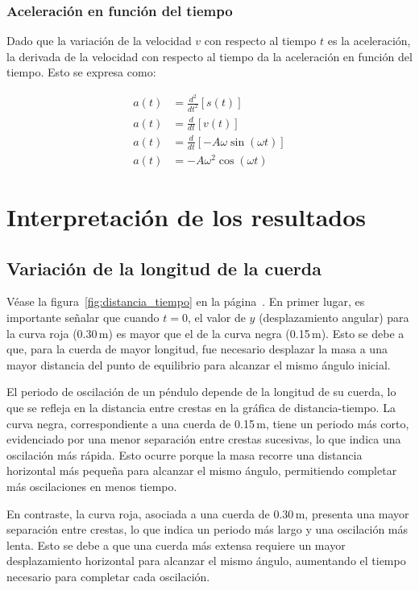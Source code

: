 \documentclass[letterpaper]{report}
\numberwithin{table}{section}
\begin{document}
\subsubsection{Aceleración en función del tiempo}

Dado que la variación de la velocidad $v$ con respecto al tiempo $t$
es la aceleración, la derivada de la velocidad con respecto al tiempo
da la aceleración en función del tiempo. Esto se expresa como:

\begin{align}
  a(t) &= \frac{d^{2}}{dt^{2}} \left[s(t)\right] \nonumber \\
  a(t) &= \frac{d}{dt} \left[v(t)\right] \nonumber \\
  a(t) &= \frac{d}{dt} \left[-A\omega\sin{(\omega t)}\right] \nonumber \\
  a(t) &= -A\omega^{2}\cos{(\omega t)}\label{eq:aceleración_tiempo}
\end{align}

\section{Interpretación de los resultados}

\subsection{Variación de la longitud de la cuerda}

Véase la figura~\ref{fig:distancia_tiempo} en la
página~\pageref{fig:distancia_tiempo}. En primer lugar, es
importante señalar que cuando $t=0$, el valor de $y$
(desplazamiento angular) para la curva roja (0.30\,m) es mayor que el de
la curva negra (0.15\,m). Esto se debe a que, para la cuerda de mayor
longitud, fue necesario desplazar la masa a una mayor distancia del
punto de equilibrio para alcanzar el mismo ángulo inicial.

El periodo de oscilación de un péndulo depende de la longitud de su
cuerda, lo que se refleja en la distancia entre crestas en la gráfica
de distancia-tiempo. La curva negra, correspondiente a una cuerda de
0.15\,m, tiene un periodo más corto, evidenciado por una menor
separación entre crestas sucesivas, lo que indica una oscilación más
rápida. Esto ocurre porque la masa recorre una distancia horizontal
más pequeña para alcanzar el mismo ángulo, permitiendo completar más
oscilaciones en menos tiempo.

En contraste, la curva roja, asociada a una cuerda de 0.30\,m, presenta
una mayor separación entre crestas, lo que indica un periodo más
largo y una oscilación más lenta. Esto se debe a que una cuerda más
extensa requiere un mayor desplazamiento horizontal para alcanzar el
mismo ángulo, aumentando el tiempo necesario para completar cada oscilación.
\end{document}
